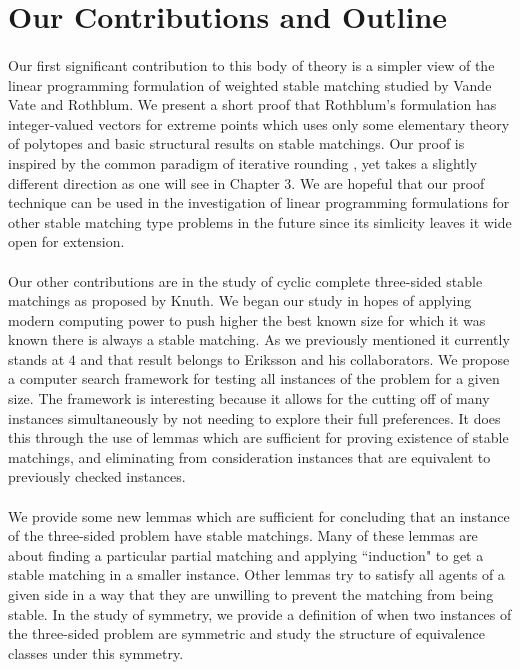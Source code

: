 \section{Our Contributions and Outline}

\paragraph{}
Our first significant contribution to this body of theory is a simpler view of the linear programming formulation of weighted stable matching studied by Vande Vate and Rothblum. We present a short proof that Rothblum's formulation has integer-valued vectors for extreme points which uses only some elementary theory of polytopes and basic structural results on stable matchings. Our proof is inspired by the common paradigm of iterative rounding \cite{lau2011iterative}, yet takes a slightly different direction as one will see in Chapter $3$. We are hopeful that our proof technique can be used in the investigation of linear programming formulations for other stable matching type problems in the future since its simlicity leaves it wide open for extension.
\paragraph{}
Our other contributions are in the study of cyclic complete three-sided stable matchings as proposed by Knuth. We began our study in hopes of applying modern computing power to push higher the best known size for which it was known there is always a stable matching. As we previously mentioned it currently stands at $4$ and that result belongs to Eriksson and his collaborators. We propose a computer search framework for testing all instances of the problem for a given size. The framework is interesting because it allows for the cutting off of many instances simultaneously by not needing to explore their full preferences. It does this through the use of lemmas which are sufficient for proving existence of stable matchings, and eliminating from consideration instances that are equivalent to previously checked instances. 
\paragraph{}
We provide some new lemmas which are sufficient for concluding that an instance of the three-sided problem have stable matchings. Many of these lemmas are about finding a particular partial matching and applying ``induction" to get a stable matching in a smaller instance. Other lemmas try to satisfy all agents of a given side in a way that they are unwilling to prevent the matching from being stable. In the study of symmetry, we provide a definition of when two instances of the three-sided problem are symmetric and study the structure of equivalence classes under this symmetry.
